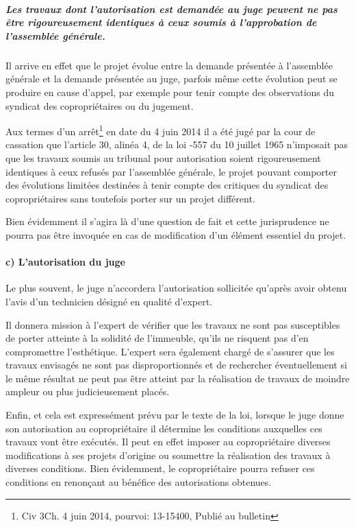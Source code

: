 				\subparagraph{Les travaux dont l’autorisation est demandée au juge peuvent ne pas être rigoureusement identiques à ceux soumis à l’approbation de l’assemblée générale.}
				Il arrive en effet que le projet évolue entre la demande présentée à l’assemblée générale et la demande présentée au juge, parfois même cette évolution peut se produire en cause d’appel, par exemple pour tenir compte des observations du syndicat des copropriétaires ou du jugement.
				
				Aux termes d’un arrêt\footnote{Civ 3\degres Ch. 4 juin 2014, pourvoi: 13-15400, Publié au bulletin} en date du 4 juin 2014 il a été jugé par la cour de cassation que l'article 30, alinéa 4, de la loi -557 du 10 juillet 1965 n'imposait pas que les travaux soumis au tribunal pour autorisation soient rigoureusement identiques à ceux refusés par l'assemblée générale, le projet pouvant comporter des évolutions limitées destinées à tenir compte des critiques du syndicat des copropriétaires sans toutefois porter sur un projet différent.
				
				Bien évidemment il s’agira là d’une question de fait et cette jurisprudence ne pourra pas être invoquée en cas de modification d’un élément essentiel du projet.
			
			\paragraph{c) L’autorisation du juge}
			
				Le plus souvent, le juge n'accordera l'autorisation sollicitée qu'après avoir obtenu l'avis d'un technicien désigné en qualité d'expert.
				
				Il donnera mission à l'expert de vérifier que les travaux ne sont pas susceptibles de porter atteinte à la solidité de l'immeuble, qu'ils ne risquent pas d'en compromettre l'esthétique. L'expert sera également chargé de s'assurer que les travaux envisagés ne sont pas disproportionnés et de rechercher éventuellement si le même résultat ne peut pas être atteint par la réalisation de travaux de moindre ampleur ou plus judicieusement placés.
				
				Enfin, et cela est expressément prévu par le texte de la loi, lorsque le juge donne son autorisation au copropriétaire il détermine les conditions auxquelles ces travaux vont être exécutés. Il peut en effet imposer au copropriétaire diverses modifications à ses projets d’origine ou soumettre la réalisation des travaux à diverses conditions. Bien évidemment, le copropriétaire pourra refuser ces conditions en renonçant au bénéfice des autorisations obtenues.
			
